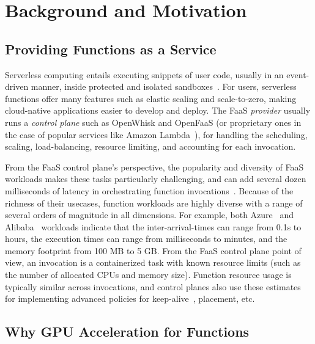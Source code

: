 \section{Background and Motivation}
\label{sec:bg}

\subsection{Providing Functions as a Service}

Serverless computing entails executing snippets of user code, usually in an event-driven manner, inside protected and isolated sandboxes~\cite{serverless-cacm-21}.
For users, serverless functions offer many features such as elastic scaling and scale-to-zero, making cloud-native applications easier to develop and deploy. 
The FaaS \emph{provider} usually runs a \emph{control plane} such as OpenWhisk and OpenFaaS (or proprietary ones in the case of popular services like Amazon Lambda~\cite{aws-lambda}), for handling the scheduling, scaling, load-balancing, resource limiting, and accounting for each invocation. 

From the FaaS control plane's perspective, the popularity and diversity of FaaS workloads makes these tasks particularly challenging, and can add several dozen milliseconds of latency in orchestrating function invocations~\cite{cvetkovic2024dirigent, fuerst2023iluvatar, serverless-cluster-cost}.
Because of the richness of their usecases, function workloads are highly diverse with a range of several orders of magnitude in all dimensions.
For example, both Azure~\cite{shahrad2020serverless} and Alibaba~\cite{luo2021characterizing} workloads indicate that the inter-arrival-times can range from 0.1s to hours, the execution times can range from milliseconds to minutes, and the memory footprint from 100 MB to 5 GB. 
From the FaaS control plane point of view, an invocation is a  containerized task with known resource limits (such as the number of allocated CPUs and memory size).
Function resource usage is typically similar across invocations, and control planes also use these estimates for implementing advanced policies for keep-alive~\cite{roy2022icebreaker,faascache-asplos21}, placement, etc. 


\subsection{Why GPU Acceleration for Functions}

